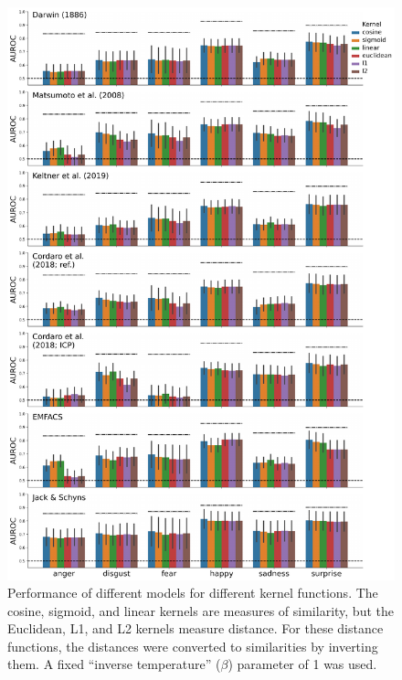 \documentclass[12pt,american,a4paper,oneside,]{memoir} %
\begin{document}
\begin{figure}
\centering
\includegraphics{_bookdown_files/hypothesis-kernel-analysis-files/figures/figure_S3.pdf}
\caption{\label{fig:fig-hka-S3}Performance of different models for different kernel functions. The cosine, sigmoid, and linear kernels are measures of similarity, but the Euclidean, L1, and L2 kernels measure distance. For these distance functions, the distances were converted to similarities by inverting them. A fixed ``inverse temperature'' (\(\beta\)) parameter of 1 was used.}
\end{figure}
\end{document}
